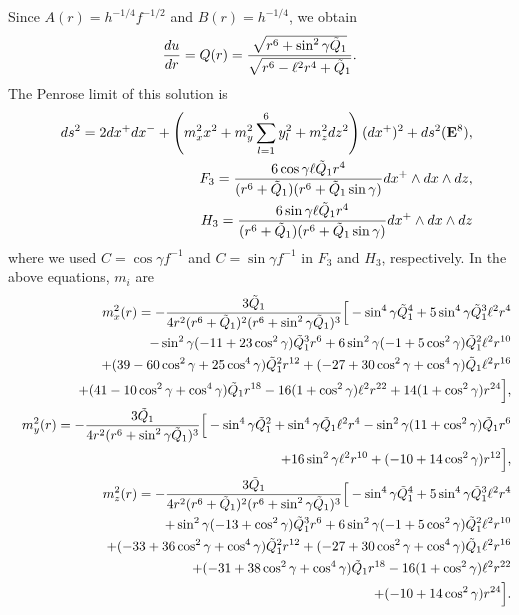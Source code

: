 \documentclass[a4paper,12pt]{article}
\begin{document}
Since $A(r)=h^{-1/4}f^{-1/2}$ and  $B(r)=h^{-1/4}$, 
we obtain
\begin{eqnarray}
{du\over dr}=Q(r)
={\sqrt{r^6+\sin^{2}\gamma \tilde{Q}_{1}}\over
\sqrt{r^6-\ell^2r^4+\tilde{Q}_{1}}}.
\label{Q(p,q)1} 
\end{eqnarray}
The Penrose limit of this solution is
\begin{eqnarray}
&&ds^2=2dx^+dx^-+\left(
m_x^2x^2 +m_y^2\sum_{l=1}^{6}y_{l}^2
+m_z^2dz^2
\right)(dx^+)^2
+ds^2({\bf E}^{8}),\nonumber \\
&&
F_{3}= \frac{6\cos\gamma\ell \tilde{Q}_1 r^4}
{(r^6+\tilde{Q}_1)(r^6+\tilde{Q}_1\sin\gamma)}
dx^+\wedge dx\wedge dz, \nonumber \\
&&
H_{3}= \frac{6\sin\gamma\ell \tilde{Q}_1 r^4}
{(r^6+\tilde{Q}_1)(r^6+\tilde{Q}_1\sin\gamma)}
dx^+\wedge dx\wedge dz
\end{eqnarray}
where we used $C=\cos\gamma f^{-1}$ and $C=\sin\gamma f^{-1}$ in 
$F_3$ and $H_3$, respectively.
In the above equations, $m_i$ are
\begin{eqnarray}
&&m^2_x(r)= -{3 \tilde{Q}_{1}\over 4 r^2(r^6+\tilde{Q}_{1})^2
(r^6+\sin^{2}\gamma\tilde{Q}_{1})^3}
\Big[ -\sin^{4}\gamma\tilde{Q}_{1}^4 
+5 \sin^{4}\gamma \tilde{Q}_{1}^3\ell^2 r^4
\nonumber \\
&&\quad\quad\quad\quad
-\sin^{2}\gamma(-11+23\cos^2\gamma )\tilde{Q}_{1}^3 r^6
+6\sin^{2}\gamma(-1+5\cos^2\gamma )\tilde{Q}_{1}^2\ell^2 r^{10}
\nonumber \\
&&\quad\quad\quad\quad
+(39-60\cos^2\gamma+25\cos^4\gamma)\tilde{Q}_{1}^2 r^{12}
+(-27+30\cos^2\gamma+\cos^4\gamma)\tilde{Q}_{1}\ell^2 r^{16}
\nonumber \\
&&\quad\quad\quad\quad
+(41-10\cos^2\gamma+\cos^4\gamma)\tilde{Q}_{1} r^{18}
-16(1+\cos^2\gamma)\ell^2 r^{22}
+14(1+\cos^2\gamma)r^{24}\Big],
\nonumber \\
&&m^2_y(r)= -{3 \tilde{Q}_{1}\over 4 r^2
(r^6+\sin^{2}\gamma\tilde{Q}_{1})^3}
\Big[ -\sin^{4}\gamma\tilde{Q}_{1}^2 + \sin^{4}\gamma \tilde{Q}_{1}\ell^2 r^4
-\sin^{2}\gamma(11+\cos^2\gamma )\tilde{Q}_{1} r^6
\nonumber \\
&&\quad\quad\quad\quad
+16\sin^{2}\gamma\ell^2 r^{10}
+(-10+14\cos^2\gamma)r^{12}\Big],
\nonumber\\
&&m^2_z(r)= -{3 \tilde{Q}_{1}\over 4 r^2(r^6+\tilde{Q}_{1})^2
(r^6+\sin^{2}\gamma\tilde{Q}_{1})^3}
\Big[ -\sin^{4}\gamma\tilde{Q}_{1}^4 
+5 \sin^{4}\gamma \tilde{Q}_{1}^3\ell^2 r^4
\nonumber \\
&&\quad\quad\quad\quad
+\sin^{2}\gamma(-13+\cos^2\gamma )\tilde{Q}_{1}^3 r^6
+6\sin^{2}\gamma(-1+5\cos^2\gamma )\tilde{Q}_{1}^2\ell^2 r^{10}
\nonumber \\
&&\quad\quad\quad\quad
+(-33+36\cos^2\gamma+\cos^4\gamma)\tilde{Q}_{1}^2 r^{12}
+(-27+30\cos^2\gamma+\cos^4\gamma)\tilde{Q}_{1}\ell^2 r^{16}
\nonumber \\
&&\quad\quad\quad\quad
+(-31+38\cos^2\gamma+\cos^4\gamma)\tilde{Q}_{1} r^{18}
-16(1+\cos^2\gamma)\ell^2 r^{22}
\nonumber \\
&&\quad\quad\quad\quad
+(-10+14\cos^2\gamma)r^{24}\Big].\label{pq1mz}
\end{eqnarray}
\end{document}
